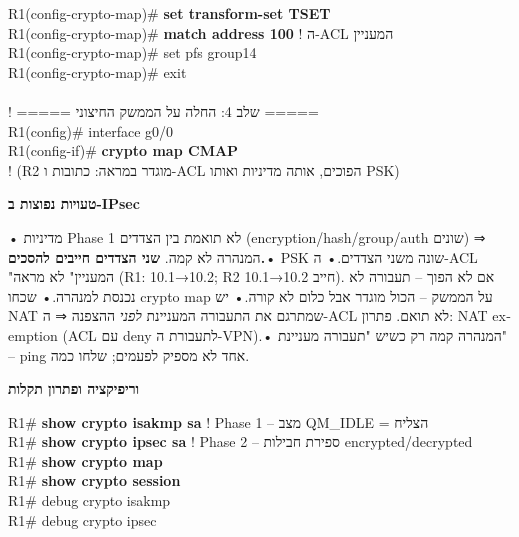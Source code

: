 \documentclass[11pt]{article}
\newcommand{\enLR}[1]{\textenglish{#1}}
\newcommand{\code}[1]{\textenglish{\codefont #1}}
\newcommand{\subheading}[1]{\vskip6pt{\bfseries\color{h3}#1\par}\vskip2pt}
\newcommand{\boxtitle}[1]{{\bfseries\color{boxti}#1}}
\newenvironment{mistakebox}{\colorlet{boxti}{misti}\begin{mdframed}[backgroundcolor=misbg,linecolor=misfr,rightline=true,leftline=false,topline=false,bottomline=false,linewidth=2pt,innertopmargin=6pt,innerbottommargin=6pt,innerleftmargin=8pt,innerrightmargin=8pt,skipabove=6pt,skipbelow=6pt]}{\end{mdframed}}
\begin{document}
\begin{codebox}
\begin{english}
R1(config-crypto-map)\# \textcolor{cbold}{\textbf{set transform-set TSET}}\\
R1(config-crypto-map)\# \textcolor{cbold}{\textbf{match address 100}}          \textcolor{ccom}{\texthebrew{! ה-\enLR{ACL} המעניין}}\\
R1(config-crypto-map)\# set pfs group14\\
R1(config-crypto-map)\# exit\\
~\\
\textcolor{ccom}{\texthebrew{! ===== שלב \enLR{4}: החלה על הממשק החיצוני =====}}\\
R1(config)\# interface g0/0\\
R1(config-if)\# \textcolor{cbold}{\textbf{crypto map CMAP}}\\
\textcolor{ccom}{\texthebrew{! \enLR{(R2} מוגדר במראה: כתובות ו-\enLR{ACL} הפוכים, אותה מדיניות ואותו \enLR{PSK)}}}
\end{english}\end{codebox}

\begin{mistakebox}\boxtitle{טעויות נפוצות ב-\enLR{IPsec}}\par  • מדיניות \enLR{Phase 1} לא תואמת בין הצדדים \enLR{(encryption/hash/group/auth} שונים) ⇒ המנהרה לא קמה. \textbf{שני הצדדים חייבים להסכים.}\newline  • \enLR{PSK} שונה משני הצדדים.\newline  • ה-\enLR{ACL "}המעניין" לא מראה \enLR{(R1: 10.1}→\enLR{10.2; R2} חייב \enLR{10.2}→\enLR{10.1).} אם לא הפוך – תעבורה לא נכנסת למנהרה.\newline  • שכחו \code{crypto map} על הממשק – הכול מוגדר אבל כלום לא קורה.\newline  • יש \enLR{NAT} שמתרגם את התעבורה המעניינת \emph{לפני} ההצפנה ⇒ ה-\enLR{ACL} לא תואם. פתרון: \enLR{NAT exemption (ACL} עם \enLR{deny} לתעבורת ה-\enLR{VPN).}\newline  • המנהרה קמה רק כשיש "תעבורה מעניינת" – \enLR{ping} אחד לא מספיק לפעמים; שלחו כמה.\end{mistakebox}

\subheading{וריפיקציה ופתרון תקלות}

\begin{codebox}\begin{english}\codefont\footnotesize\color{cfg}\setlength{\parindent}{0pt}
R1\# \textcolor{cbold}{\textbf{show crypto isakmp sa}}          \textcolor{ccom}{\texthebrew{! \enLR{Phase 1} – מצב \enLR{QM\_IDLE} = הצליח}}\\
R1\# \textcolor{cbold}{\textbf{show crypto ipsec sa}}           \textcolor{ccom}{\texthebrew{! \enLR{Phase 2} – ספירת חבילות \enLR{encrypted/decrypted}}}\\
R1\# \textcolor{cbold}{\textbf{show crypto map}}\\
R1\# \textcolor{cbold}{\textbf{show crypto session}}\\
R1\# debug crypto isakmp\\
R1\# debug crypto ipsec
\end{english}\end{codebox}
\end{document}
